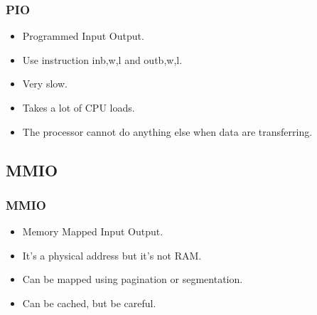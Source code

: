 \begin{frame}
        \frametitle{PIO}
        \begin{itemize}
        \item Programmed Input Output.
        \item Use instruction in{b,w,l} and out{b,w,l}.
        \item Very slow.
        \item Takes a lot of CPU loads.
        \item The processor cannot do anything else when data are transferring.
        \end{itemize}
\end{frame}

\begin{frame}
\begin{center}
\begin{overlayarea}{10cm}{10cm}
\end{overlayarea}
\end{center}
\end{frame}

\subsection{MMIO}
\begin{frame}
        \frametitle{MMIO}
        \begin{itemize}
        \item Memory Mapped Input Output.
        \item It's a physical address but it's not RAM.
        \item Can be mapped using pagination or segmentation.
        \item Can be cached, but be careful.
        \end{itemize}
\end{frame}

\begin{frame}
\begin{center}
\begin{overlayarea}{10cm}{10cm}
\end{overlayarea}
\end{center}
\end{frame}

